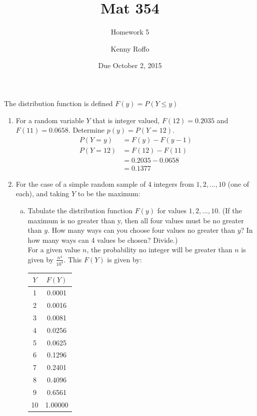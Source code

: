 \documentclass{scrartcl}
\title{Mat 354}
\subtitle{Homework 5}
\author{Kenny Roffo}
\date{Due October 2, 2015}
\begin{document}
\maketitle

The distribution function is defined $F(y) = P(Y \le y)$

\begin{enumerate}

\item For a random variable $Y$ that is integer valued, $F(12) = 0.2035$ and $F(11) = 0.0658$. Determine $p(y) = P(Y = 12)$.\\
  \begin{align*}
    P(Y = y) &= F(y) - F(y-1)\\
    P(Y = 12) &= F(12) - F(11)\\
              &= 0.2035 - 0.0658\\
              &= 0.1377
  \end{align*}

\item For the case of a simple random sample of 4 integers from $1, 2, ..., 10$ (one of each), and taking $Y$ to be the maximum:\\

  \begin{enumerate}[a)]
    \item Tabulate the distribution function $F(y)$ for values $1, 2, ..., 10$. (If the maximum is no greater than y, then all four values must be no greater than $y$. How many ways can you choose four values no greater than $y$? In how many ways can 4 values be chosen? Divide.)\\

      For a given value $n$, the probability no integer will be greater than $n$ is given by $\frac{n^4}{10^4}$. This $F(Y)$ is given by:
      \begin{center}
        \begin{tabular} { |c|c| }
          \hline
          $Y$&$F(Y)$\\
          \hline
          1  & 0.0001\\
          \hline
          2  & 0.0016\\
          \hline
          3  & 0.0081\\
          \hline
          4  & 0.0256\\
          \hline
          5  & 0.0625\\
          \hline
          6  & 0.1296\\
          \hline
          7  & 0.2401\\
          \hline
          8  & 0.4096\\
          \hline
          9  & 0.6561\\
          \hline
          10 & 1.00000\\
          \hline
        \end{tabular}
      \end{center}
      

\end{enumerate}
\end{enumerate}
\end{document}
